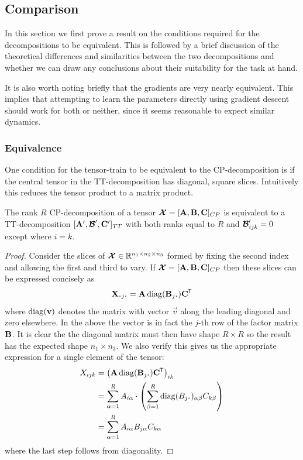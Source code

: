{\subsection{Comparison}
In this section we first prove a result on the conditions required for the decompositions to
be equivalent. This is followed by a brief discussion of the theoretical differences and
similarities between the two decompositions and whether we can draw any conclusions about their
suitability for the task at hand. 

It is also worth noting briefly that the gradients are very nearly equivalent. This implies
that attempting to learn the parameters directly using gradient descent should work for both
or neither, since it seems reasonable to expect similar dynamics.

\subsubsection{Equivalence}
One condition for the tensor-train to be equivalent to the CP-decomposition is if the central
tensor in the TT-decomposition has diagonal, square slices. Intuitively this reduces the tensor
product to a matrix product. 

\begin{prop}
The rank \(R\) CP-decomposition of a tensor \(\bm{\mathcal{X}} = [\mathbf{A},\mathbf{B},\mathbf{C}]_{CP}\) is
equivalent to a TT-decomposition \([\mathbf{A}', \bm{\mathcal{B}}', \mathbf{C}']_{TT}\) with both ranks
equal to \(R\) and \(\bm{\mathcal{B}}'_{ijk} = 0\) except where \(i=k\).
\end{prop}
\begin{proof}
Consider the slices of \(\bm{\mathcal{X}} \in \mathbb{R}^{n_1 \times n_2 \times n_3}\) formed by fixing the
second index and allowing the first and third to vary. If 
\(\bm{\mathcal{X}} = [\mathbf{A}, \mathbf{B}, \mathbf{C}]_{CP}\) then these slices can be expressed concisely as
\begin{equation} \label{eq:cp-slice}
	\mat{X}_{\midbullet j \midbullet} = \mat{A}\diag({\mat{B}_{j\midbullet}})\tran{\mat{C}}
\end{equation} where \(\operatorname{diag}(\mathbf{v})\) denotes the matrix with vector \(\vec{v}\) along the
leading diagonal and zero elsewhere. In the above the vector is in fact the \(j\)-th row of
the factor matrix \(\mathbf{B}\). It is clear the the diagonal matrix must then have shape
\(R \times R\) so the result has the expected shape \(n_1 \times n_3\). We also verify this gives us
the appropriate expression for a single element of the tensor:
\begin{align}
	X_{ijk} &= \left(\mat{A}\diag({\mat{B}_{j\midbullet}})\tran{\mat{C}}\right)_{ik} \\
		    &= \sum_{\alpha=1}^R A_{i\alpha} \cdot
		    	\left(\sum_{\beta=1}^{R} \diag(B_{j\midbullet})_{\alpha\beta} C_{k\beta}\right) \\
			&= \sum_{\alpha=1}^R A_{i\alpha} B_{j\alpha} C_{k\alpha}
\end{align} where the last step follows from diagonality.


\end{proof}}

